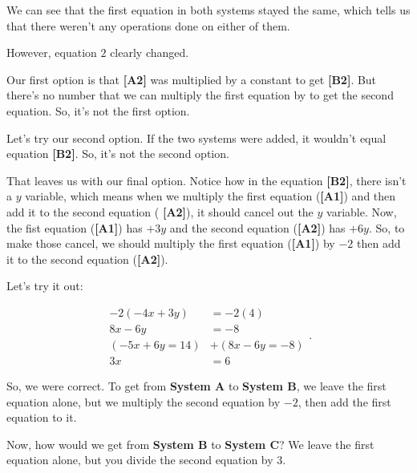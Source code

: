 \begin{example}
  We can see that the first equation in both systems stayed the same, which
  tells us that there weren't any operations done on either of them.

  However, equation $2$ clearly changed.

  Our first option is that \textbf{[A2]} was multiplied by a constant to get
  \textbf{[B2]}. But there's no number that we can multiply the first equation
  by to get the second equation. So, it's not the first option.

  Let's try our second option. If the two systems were added, it wouldn't equal
  equation \textbf{[B2]}. So, it's not the second option.

  That leaves us with our final option. Notice how in the equation
  \textbf{[B2]}, there isn't a $y$ variable, which means when we multiply the
  first equation (\textbf{[A1]}) and then add it to the second equation (
  \textbf{[A2]}), it should cancel out the $y$ variable. Now, the fist equation
  (\textbf{[A1]}) has $+3y$ and the second equation (\textbf{[A2]}) has $+6y$.
  So, to make those cancel, we should multiply the first equation
  (\textbf{[A1]}) by $-2$ then add it to the second equation (\textbf{[A2]}).

  Let's try it out:

  \begin{equation}
    \label{spt:testing_out_system_of_equation_1}
    \begin{split}
      -2(-4x + 3y) &= -2(4) \\
      8x - 6y &= -8 \\
      (-5x + 6y = 14) &+ (8x - 6y = -8) \\
      3x &= 6
    \end{split}
  .\end{equation}

  So, we were correct. To get from \textbf{System A} to \textbf{System B}, we
  leave the first equation alone, but we multiply the second equation by $-2$,
  then add the first equation to it.

  Now, how would we get from \textbf{System B} to \textbf{System C}? We leave
  the first equation alone, but you divide the second equation by $3$.
\end{example}

\newpage

